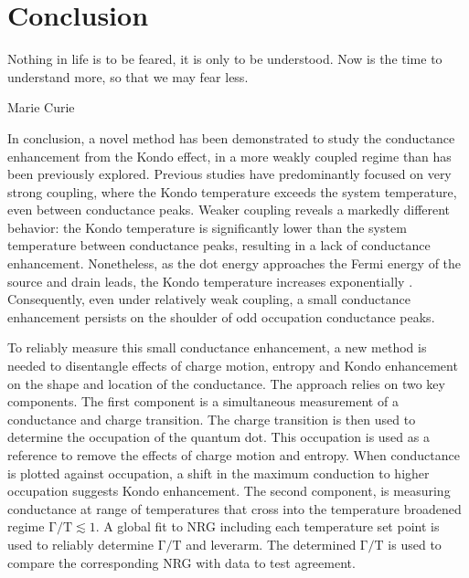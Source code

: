 \chapter{Conclusion}\label{cha:conclusion}


\epigraph{Nothing in life is to be feared, it is only to be understood. Now is the time to understand more, so that we may fear less.}{Marie Curie}

In conclusion, a novel method has been demonstrated to study the conductance enhancement from the Kondo effect, in a more weakly coupled regime than has been previously explored. 
Previous studies have predominantly focused on very strong coupling, where the Kondo temperature exceeds the system temperature, even between conductance peaks.
Weaker coupling reveals a markedly different behavior: the Kondo temperature is significantly lower than the system temperature between conductance peaks, resulting in a lack of conductance enhancement.
Nonetheless, as the dot energy approaches the Fermi energy of the source and drain leads, the Kondo temperature increases exponentially . 
Consequently, even under relatively weak coupling, a small conductance enhancement persists on the shoulder of odd occupation conductance peaks.




To reliably measure this small conductance enhancement, a new method is needed to disentangle effects of charge motion, entropy and Kondo enhancement on the shape and location of the conductance. 
The approach relies on two key components. 
The first component is a simultaneous measurement of a conductance and charge transition. The charge transition is then used to determine the occupation of the quantum dot. This occupation is used as a reference to remove the effects of charge motion and entropy. When conductance is plotted against occupation, a shift in the maximum conduction to higher occupation suggests Kondo enhancement. 
The second component, is measuring conductance at range of temperatures that cross into the temperature broadened regime $\mathrm{\Gamma/T} \lesssim 1$. A global fit to NRG including each temperature set point is used to reliably determine $\mathrm{\Gamma/T}$ and leverarm. The determined $\mathrm{\Gamma/T}$ is used to compare the corresponding NRG with data to test agreement. 

